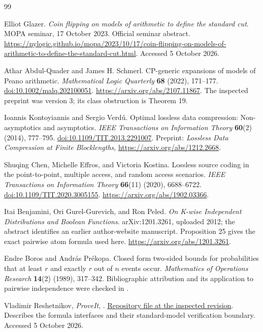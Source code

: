 \documentclass[11pt]{article}
\numberwithin{equation}{section}
\theoremstyle{definition}
\theoremstyle{remark}
\begin{document}
\begin{thebibliography}{99}

Elliot Glazer.
\emph{Coin flipping on models of arithmetic to define the standard cut}.
MOPA seminar, 17 October 2023. Official seminar abstract.
\url{https://nylogic.github.io/mopa/2023/10/17/coin-flipping-on-models-of-arithmetic-to-define-the-standard-cut.html}.
Accessed 5 October 2026.

Athar Abdul-Quader and James H. Schmerl.
CP-generic expansions of models of Peano arithmetic.
\emph{Mathematical Logic Quarterly} \textbf{68} (2022), 171--177.
\href{https://doi.org/10.1002/malq.202100051}{doi:10.1002/malq.202100051}.
\url{https://arxiv.org/abs/2107.11867}.
The inspected preprint was version 3; its class obstruction is Theorem 19.

Ioannis Kontoyiannis and Sergio Verd\'u.
Optimal lossless data compression: Non-asymptotics and asymptotics.
\emph{IEEE Transactions on Information Theory} \textbf{60}(2) (2014),
777--795.
\href{https://doi.org/10.1109/TIT.2013.2291007}{doi:10.1109/TIT.2013.2291007}.
Preprint: \emph{Lossless Data Compression at Finite Blocklengths},
\url{https://arxiv.org/abs/1212.2668}.

Shuqing Chen, Michelle Effros, and Victoria Kostina.
Lossless source coding in the point-to-point, multiple access, and random
access scenarios.
\emph{IEEE Transactions on Information Theory} \textbf{66}(11) (2020),
6688--6722.
\href{https://doi.org/10.1109/TIT.2020.3005155}{doi:10.1109/TIT.2020.3005155}.
\url{https://arxiv.org/abs/1902.03366}.

Itai Benjamini, Ori Gurel-Gurevich, and Ron Peled.
\emph{On K-wise Independent Distributions and Boolean Functions}.
arXiv:1201.3261, uploaded 2012; the abstract identifies an earlier
author-website manuscript. Proposition 25 gives the exact pairwise
atom formula used here.
\url{https://arxiv.org/abs/1201.3261}.

Endre Boros and Andr\'as Pr\'ekopa.
Closed form two-sided bounds for probabilities that at least $r$ and
exactly $r$ out of $n$ events occur.
\emph{Mathematics of Operations Research} \textbf{14}(2) (1989), 317--342.
Bibliographic attribution and its application to pairwise independence
were checked in \cite{benjamini-gurel-peled}.

Vladimir Reshetnikov, \emph{ProveIt},
.
\href{https://github.com/VladimirReshetnikov/ProveIt/blob/3b9458b31f459b480ab43a068d7cc56f4cfdbb28/Logic/PeanoArithmetic/ListCoding/README.md}{Repository file at the inspected revision}.
Describes the formula interfaces and their standard-model verification
boundary. Accessed 5 October 2026.


\end{thebibliography}
\end{document}
